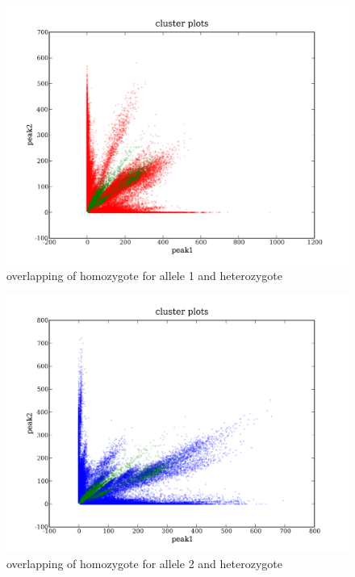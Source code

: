 \documentclass[a4paper,10pt]{article}
\begin{document}
\begin{figure}
\includegraphics[width=1\textwidth]{figures/cluster_plots_allele1_het.png}
\caption{overlapping of homozygote for allele 1 and heterozygote}\label{f5}
\end{figure}

\begin{figure}
\includegraphics[width=1\textwidth]{figures/cluster_plots_allele2_het.png}
\caption{overlapping of homozygote for allele 2 and heterozygote}\label{f6}
\end{figure}
\end{document}
